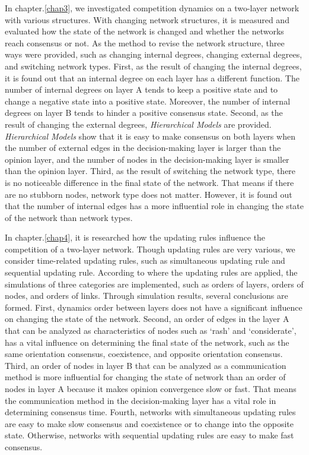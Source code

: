 In chapter.\ref{chap3}, we investigated competition dynamics on a two-layer network with various structures. With changing network structures, it is measured and evaluated how the state of the network is changed and whether the networks reach consensus or not. As the method to revise the network structure, three ways were provided, such as changing internal degrees, changing external degrees, and switching network types. First, as the result of changing the internal degrees, it is found out that an internal degree on each layer has a different function. The number of internal degrees on layer A tends to keep a positive state and to change a negative state into a positive state. Moreover, the number of internal degrees on layer B tends to hinder a positive consensus state. Second, as the result of changing the external degrees, \textit{Hierarchical Models} are provided. \textit{Hierarchical Models} show that it is easy to make consensus on both layers when the number of external edges in the decision-making layer is larger than the opinion layer, and the number of nodes in the decision-making layer is smaller than the opinion layer. Third, as the result of switching the network type, there is no noticeable difference in the final state of the network. That means if there are no stubborn nodes, network type does not matter. However, it is found out that the number of internal edges has a more influential role in changing the state of the network than network types.

In chapter.\ref{chap4}, it is researched how the updating rules influence the competition of a two-layer network. Though updating rules are very various, we consider time-related updating rules, such as simultaneous updating rule and sequential updating rule. According to where the updating rules are applied, the simulations of three categories are implemented, such as orders of layers, orders of nodes, and orders of links. Through simulation results, several conclusions are formed. First, dynamics order between layers does not have a significant influence on changing the state of the network. Second, an order of edges in the layer A that can be analyzed as characteristics of nodes such as `rash' and `considerate', has a vital influence on determining the final state of the network, such as the same orientation consensus, coexistence, and opposite orientation consensus. Third, an order of nodes in layer B that can be analyzed as a communication method is more influential for changing the state of network than an order of nodes in layer A because it makes opinion convergence slow or fast. That means the communication method in the decision-making layer has a vital role in determining consensus time. Fourth, networks with simultaneous updating rules are easy to make slow consensus and coexistence or to change into the opposite state. Otherwise, networks with sequential updating rules are easy to make fast consensus.

